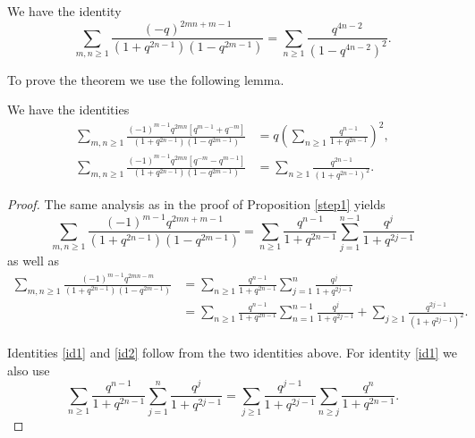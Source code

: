 \documentclass[a4paper,reqno,12pt]{amsart}
\begin{document}
\begin{theorem} \label{other-even} We have the identity
$$\sum_{m,n \geq1} \frac{(-q)^{2mn+m-1}}{(1+q^{2n-1})(1-q^{2m-1})} = \sum_{n\geq1} \frac{q^{4n-2}}{(1-q^{4n-2})^2}.$$
\end{theorem}

To prove the theorem we use the following lemma. 


\begin{lemma} \label{lemma11} We have the identities
\begin{align} 
\sum_{m,n \geq1} \frac{(-1)^{m-1}q^{2mn}[q^{m-1}+q^{-m}]}{(1+q^{2n-1})(1-q^{2m-1})} 
&  = q\left(\sum_{n\geq1} \frac{q^{n-1}}{1+q^{2n-1}} \right)^2, \label{id1} \\ 
\sum_{m,n \geq1} \frac{(-1)^{m-1}q^{2mn}[q^{-m}-q^{m-1}]}{(1+q^{2n-1})(1-q^{2m-1})} 
&=\sum_{n\geq1} \frac{q^{2n-1}}{(1+q^{2n-1})^2}.\label{id2}
\end{align}
\end{lemma}

\begin{proof} 
The same analysis as in the proof of Proposition \ref{step1} yields
$$\sum_{m,n \geq1} \frac{(-1)^{m-1} q^{2mn+m-1}}{(1+q^{2n-1})(1-q^{2m-1})}
=\sum_{n\geq1} \frac{q^{n-1}}{1+q^{2n-1}} \sum_{j=1}^{n-1} \frac{q^j}{1+q^{2j-1}} $$
as well as
\begin{align*}
\sum_{m,n\geq1} \frac{ (-1)^{m-1} q^{2mn-m}}{(1+q^{2n-1})(1-q^{2m-1})}  
&= \sum_{n\geq1} \frac{q^{n-1}}{1+q^{2n-1}} \sum_{j=1}^n \frac{q^j}{1+q^{2j-1}} \\
&= \sum_{n\geq1} \frac{q^{n-1}}{1+q^{2n-1}} \sum_{n=1}^{n-1} \frac{q^j}{1+q^{2j-1}}  + \sum_{j\geq1} \frac{q^{2j-1}}{(1+q^{2j-1})^2}.
\end{align*}

Identities \eqref{id1} and \eqref{id2} follow from the two identities above. For   identity \eqref{id1} we also use $$\sum_{n\geq1} \frac{q^{n-1}}{1+q^{2n-1}} \sum_{j=1}^n \frac{q^j}{1+q^{2j-1}}
=\sum_{j\geq1} \frac{q^{j-1}}{1+q^{2j-1}} \sum_{n\geq j} \frac{q^n}{1+q^{2n-1}}.$$
\end{proof}
\end{document}
